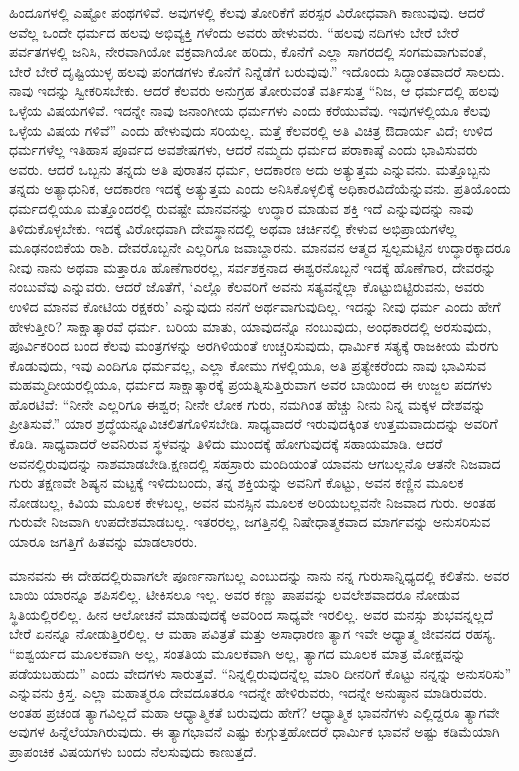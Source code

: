 ಹಿಂದೂಗಳಲ್ಲಿ ಎಷ್ಟೋ ಪಂಥಗಳಿವೆ. ಅವುಗಳಲ್ಲಿ ಕೆಲವು ತೋರಿಕೆಗೆ ಪರಸ್ಪರ ವಿರೋಧವಾಗಿ ಕಾಣುವುವು. ಆದರೆ ಅವೆಲ್ಲ ಒಂದೇ ಧರ್ಮದ ಹಲವು ಅಭಿವ್ಯಕ್ತಿ ಗಳೆಂದು ಅವರು ಹೇಳುವರು. “ಹಲವು ನದಿಗಳು ಬೇರೆ ಬೇರೆ ಪರ್ವತಗಳಲ್ಲಿ ಜನಿಸಿ, ನೇರವಾಗಿಯೋ ವಕ್ರವಾಗಿಯೋ ಹರಿದು, ಕೊನೆಗೆ ಎಲ್ಲಾ ಸಾಗರದಲ್ಲಿ ಸಂಗಮವಾಗುವಂತೆ, ಬೇರೆ ಬೇರೆ ದೃಷ್ಟಿಯುಳ್ಳ ಹಲವು ಪಂಗಡಗಳು ಕೊನೆಗೆ ನಿನ್ನೆಡೆಗೆ ಬರುವುವು.” ಇದೊಂದು ಸಿದ್ಧಾಂತವಾದರೆ ಸಾಲದು. ನಾವು ಇದನ್ನು ಸ್ವೀಕರಿಸಬೇಕು. ಆದರೆ ಕೆಲವರು ಅನುಗ್ರಹ ತೋರುವಂತೆ ವರ್ತಿಸುತ್ತ “ನಿಜ, ಆ ಧರ್ಮದಲ್ಲಿ ಹಲವು ಒಳ್ಳೆಯ ವಿಷಯಗಳಿವೆ. ಇದನ್ನೇ ನಾವು ಜನಾಂಗೀಯ ಧರ್ಮಗಳು ಎಂದು ಕರೆಯುವೆವು. ಇವುಗಳಲ್ಲಿಯೂ ಕೆಲವು ಒಳ್ಳೆಯ ವಿಷಯ ಗಳಿವೆ” ಎಂದು ಹೇಳುವುದು ಸರಿಯಲ್ಲ. ಮತ್ತೆ ಕೆಲವರಲ್ಲಿ ಅತಿ ವಿಚಿತ್ರ ಔದಾರ್ಯ ವಿದೆ; ಉಳಿದ ಧರ್ಮಗಳೆಲ್ಲ ಇತಿಹಾಸ ಪೂರ್ವದ ಅವಶೇಷಗಳು, ಆದರೆ ನಮ್ಮದು ಧರ್ಮದ ಪರಾಕಾಷ್ಠೆ ಎಂದು ಭಾವಿಸುವರು ಅವರು. ಆದರೆ ಒಬ್ಬನು ತನ್ನದು ಅತಿ ಪುರಾತನ ಧರ್ಮ, ಆದಕಾರಣ ಅದು ಅತ್ಯುತ್ತಮ ಎನ್ನುವನು. ಮತ್ತೊಬ್ಬನು ತನ್ನದು ಅತ್ಯಾಧುನಿಕ, ಆದಕಾರಣ ಇದಕ್ಕೆ ಅತ್ಯುತ್ತಮ ಎಂದು ಅನಿಸಿಕೊಳ್ಳಲಿಕ್ಕೆ ಅಧಿಕಾರವಿದೆಯೆನ್ನುವನು. ಪ್ರತಿಯೊಂದು ಧರ್ಮದಲ್ಲಿಯೂ ಮತ್ತೊಂದರಲ್ಲಿ ರುವಷ್ಟೇ ಮಾನವನನ್ನು ಉದ್ಧಾರ ಮಾಡುವ ಶಕ್ತಿ ಇದೆ ಎನ್ನುವುದನ್ನು ನಾವು ತಿಳಿದುಕೊಳ್ಳಬೇಕು. ಇದಕ್ಕೆ ವಿರೋಧವಾಗಿ ದೇವಸ್ಥಾನದಲ್ಲಿ ಅಥವಾ ಚರ್ಚಿನಲ್ಲಿ ಕೇಳುವ ಅಭಿಪ್ರಾಯಗಳೆಲ್ಲ ಮೂಢನಂಬಿಕೆಯ ರಾಶಿ. ದೇವರೊಬ್ಬನೇ ಎಲ್ಲರಿಗೂ ಜವಾಬ್ದಾರನು. ಮಾನವನ ಆತ್ಮದ ಸ್ವಲ್ಪಮಟ್ಟಿನ ಉದ್ಧಾರಕ್ಕಾದರೂ ನೀವು ನಾನು ಅಥವಾ ಮತ್ತಾರೂ ಹೊಣೆಗಾರರಲ್ಲ, ಸರ್ವಶಕ್ತನಾದ ಈಶ್ವರನೊಬ್ಬನೆ ಇದಕ್ಕೆ ಹೊಣೆಗಾರ, ದೇವರನ್ನು ನಂಬುವೆವು ಎನ್ನುವರು. ಆದರೆ ಜೊತೆಗೆ, ‘ಎಲ್ಲೊ ಕೆಲವರಿಗೆ ಅವನು ಸತ್ಯವನ್ನೆಲ್ಲಾ ಕೊಟ್ಟುಬಿಟ್ಟಿರುವನು, ಅವರು ಉಳಿದ ಮಾನವ ಕೋಟಿಯ ರಕ್ಷಕರು’ ಎನ್ನುವುದು ನನಗೆ ಅರ್ಥವಾಗುವುದಿಲ್ಲ. ಇದನ್ನು ನೀವು ಧರ್ಮ ಎಂದು ಹೇಗೆ ಹೇಳುತ್ತೀರಿ? ಸಾಕ್ಷಾತ್ಕಾರವೆ ಧರ್ಮ. ಬರಿಯ ಮಾತು, ಯಾವುದನ್ನೊ ನಂಬುವುದು, ಅಂಧಕಾರದಲ್ಲಿ ಅರಸುವುದು, ಪೂರ್ವಿಕರಿಂದ ಬಂದ ಕೆಲವು ಮಂತ್ರಗಳನ್ನು ಅರಗಿಳಿಯಂತೆ ಉಚ್ಚರಿಸುವುದು, ಧಾರ್ಮಿಕ ಸತ್ಯಕ್ಕೆ ರಾಜಕೀಯ ಮೆರಗು ಕೊಡುವುದು, ಇವು ಎಂದಿಗೂ ಧರ್ಮವಲ್ಲ, ಎಲ್ಲಾ ಕೋಮು ಗಳಲ್ಲಿಯೂ, ಅತಿ ಪ್ರತ್ಯೇಕರೆಂದು ನಾವು ಭಾವಿಸುವ ಮಹಮ್ಮದೀಯರಲ್ಲಿಯೂ, ಧರ್ಮದ ಸಾಕ್ಷಾತ್ಕಾರಕ್ಕೆ ಪ್ರಯತ್ನಿಸುತ್ತಿರುವಾಗ ಅವರ ಬಾಯಿಂದ ಈ ಉಜ್ಜಲ ಪದಗಳು ಹೊರಟಿವೆ: “ನೀನೇ ಎಲ್ಲರಿಗೂ ಈಶ್ವರ; ನೀನೇ ಲೋಕ ಗುರು, ನಮಗಿಂತ ಹೆಚ್ಚು ನೀನು ನಿನ್ನ ಮಕ್ಕಳ ದೇಶವನ್ನು ಪ್ರೀತಿಸುವೆ.” ಯಾರ ಶ್ರದ್ಧೆಯನ್ನೂವಿಚಲಿತಗೊಳಿಸಬೇಡಿ. ಸಾಧ್ಯವಾದರೆ ಇರುವುದಕ್ಕಿಂತ ಉತ್ತಮವಾದುದನ್ನು ಅವರಿಗೆ ಕೊಡಿ. ಸಾಧ್ಯವಾದರೆ ಅವನಿರುವ ಸ್ಥಳವನ್ನು ತಿಳಿದು ಮುಂದಕ್ಕೆ ಹೋಗುವುದಕ್ಕೆ ಸಹಾಯಮಾಡಿ. ಆದರೆ ಅವನಲ್ಲಿರುವುದನ್ನು ನಾಶಮಾಡಬೇಡಿ.ಕ್ಷಣದಲ್ಲಿ ಸಹಸ್ರಾರು ಮಂದಿಯಂತೆ ಯಾವನು ಆಗಬಲ್ಲನೊ ಆತನೇ ನಿಜವಾದ ಗುರು ತಕ್ಷಣವೇ ಶಿಷ್ಯನ ಮಟ್ಟಕ್ಕೆ ಇಳಿದುಬಂದು, ತನ್ನ ಶಕ್ತಿಯನ್ನು ಅವನಿಗೆ ಕೊಟ್ಟು, ಅವನ ಕಣ್ಣಿನ ಮೂಲಕ ನೋಡಬಲ್ಲ, ಕಿವಿಯ ಮೂಲಕ ಕೇಳಬಲ್ಲ, ಅವನ ಮನಸ್ಸಿನ ಮೂಲಕ ಅರಿಯಬಲ್ಲವನೇ ನಿಜವಾದ ಗುರು. ಅಂತಹ ಗುರುವೇ ನಿಜವಾಗಿ ಉಪದೇಶಮಾಡಬಲ್ಲ. ಇತರರಲ್ಲ, ಜಗತ್ತಿನಲ್ಲಿ ನಿಷೇಧಾತ್ಮಕವಾದ ಮಾರ್ಗವನ್ನು ಅನುಸರಿಸುವ ಯಾರೂ ಜಗತ್ತಿಗೆ ಹಿತವನ್ನು ಮಾಡಲಾರರು.

ಮಾನವನು ಈ ದೇಹದಲ್ಲಿರುವಾಗಲೇ ಪೂರ್ಣನಾಗಬಲ್ಲ ಎಂಬುದನ್ನು ನಾನು ನನ್ನ ಗುರುಸಾನ್ನಿಧ್ಯದಲ್ಲಿ ಕಲಿತೆನು. ಅವರ ಬಾಯಿ ಯಾರನ್ನೂ ಶಪಿಸಲಿಲ್ಲ. ಟೀಕಿಸಲೂ ಇಲ್ಲ. ಅವರ ಕಣ್ಣು ಪಾಪವನ್ನು ಲವಲೇಶವಾದರೂ ನೋಡುವ ಸ್ಥಿತಿಯಲ್ಲಿರಲಿಲ್ಲ. ಹೀನ ಆಲೋಚನೆ ಮಾಡುವುದಕ್ಕೆ ಅವರಿಂದ ಸಾಧ್ಯವೇ ಇರಲಿಲ್ಲ. ಅವರ ಮನಸ್ಸು ಶುಭವನ್ನಲ್ಲದೆ ಬೇರೆ ಏನನ್ನೂ ನೋಡುತ್ತಿರಲಿಲ್ಲ. ಆ ಮಹಾ ಪವಿತ್ರತೆ ಮತ್ತು ಅಸಾಧಾರಣ ತ್ಯಾಗ ಇವೇ ಅಧ್ಯಾತ್ಮ ಜೀವನದ ರಹಸ್ಯ. “ಐಶ್ವರ್ಯದ ಮೂಲಕವಾಗಿ ಅಲ್ಲ, ಸಂತತಿಯ ಮೂಲಕವಾಗಿ ಅಲ್ಲ, ತ್ಯಾಗದ ಮೂಲಕ ಮಾತ್ರ ಮೋಕ್ಷವನ್ನು ಪಡೆಯಬಹುದು” ಎಂದು ವೇದಗಳು ಸಾರುತ್ತವೆ. “ನಿನ್ನಲ್ಲಿರುವುದನ್ನೆಲ್ಲ ಮಾರಿ ದೀನರಿಗೆ ಕೊಟ್ಟು ನನ್ನನ್ನು ಅನುಸರಿಸು” ಎನ್ನುವನು ಕ್ರಿಸ್ತ. ಎಲ್ಲಾ ಮಹಾತ್ಮರೂ ದೇವದೂತರೂ ಇದನ್ನೇ ಹೇಳಿರುವರು, ಇದನ್ನೇ ಅನುಷ್ಠಾನ ಮಾಡಿರುವರು. ಅಂತಹ ಪ್ರಚಂಡ ತ್ಯಾಗವಿಲ್ಲದೆ ಮಹಾ ಆಧ್ಯಾತ್ಮಿಕತೆ ಬರುವುದು ಹೇಗೆ? ಆಧ್ಯಾತ್ಮಿಕ ಭಾವನೆಗಳು ಎಲ್ಲಿದ್ದರೂ ತ್ಯಾಗವೇ ಅವುಗಳ ಹಿನ್ನೆಲೆಯಾಗಿರುವುದು. ಈ ತ್ಯಾಗಭಾವನೆ ಎಷ್ಟು ಕುಗ್ಗುತ್ತಹೋದರೆ ಧಾರ್ಮಿಕ ಭಾವನೆ ಅಷ್ಟು ಕಡಿಮೆಯಾಗಿ ಪ್ರಾಪಂಚಿಕ ವಿಷಯಗಳು ಬಂದು ನೆಲಸುವುದು ಕಾಣುತ್ತದೆ.

